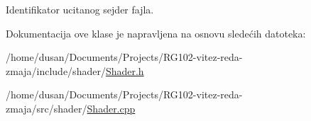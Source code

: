 Identifikator ucitanog sejder fajla. 



Dokumentacija ove klase je napravljena na osnovu sledećih datoteka\+:\begin{DoxyCompactItemize}
\item 
/home/dusan/\+Documents/\+Projects/\+R\+G102-\/vitez-\/reda-\/zmaja/include/shader/\hyperlink{Shader_8h}{Shader.\+h}\item 
/home/dusan/\+Documents/\+Projects/\+R\+G102-\/vitez-\/reda-\/zmaja/src/shader/\hyperlink{Shader_8cpp}{Shader.\+cpp}\end{DoxyCompactItemize}

